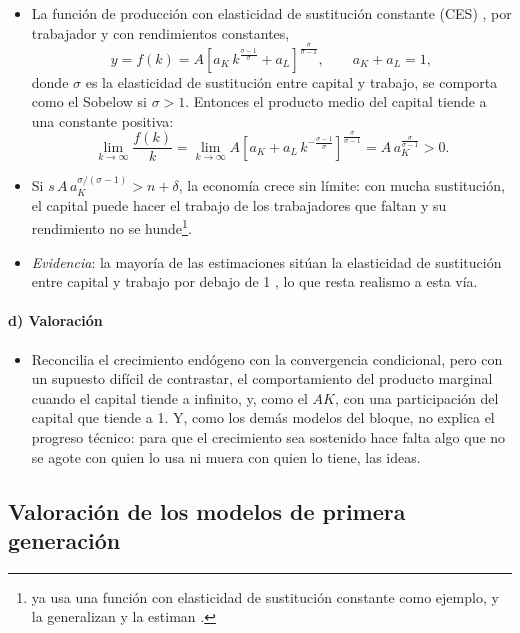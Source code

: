 \documentclass[11pt]{article}
\begin{document}
\begin{itemize}
\item La función de producción con elasticidad de sustitución constante (CES) , por trabajador y con rendimientos constantes,
  \[y=f(k)=A\left[a_K\,k^{\frac{\sigma-1}{\sigma}}+a_L\right]^{\frac{\sigma}{\sigma-1}},\qquad a_K+a_L=1,\]
  donde $\sigma$ es la elasticidad de sustitución entre capital y trabajo, se comporta como el Sobelow si $\sigma>1$. Entonces el producto medio del capital tiende a una constante positiva:
  \[\lim_{k\to\infty}\frac{f(k)}{k}=\lim_{k\to\infty}A\left[a_K+a_L\,k^{-\frac{\sigma-1}{\sigma}}\right]^{\frac{\sigma}{\sigma-1}}=A\,a_K^{\frac{\sigma}{\sigma-1}}>0.\]
\item Si $s\,A\,a_K^{\sigma/(\sigma-1)}>n+\delta$, la economía crece sin límite: con mucha sustitución, el capital puede hacer el trabajo de los trabajadores que faltan y su rendimiento no se hunde\nocite{BarroSalaiMartin2004}\footnote{\textcite[p.~77]{Solow1956} ya usa una función con elasticidad de sustitución constante como ejemplo, y \textcite{ArrowCheneryMinhasSolow1961} la generalizan y la estiman\nocite{KlumpPreissler2000} .}.
\item \emph{Evidencia}: la mayoría de las estimaciones sitúan la elasticidad de sustitución entre capital y trabajo por debajo de 1 , lo que resta realismo a esta vía.
\end{itemize}

\paragraph{d) Valoración}

\begin{itemize}
\item Reconcilia el crecimiento endógeno con la convergencia condicional, pero con un supuesto difícil de contrastar, el comportamiento del producto marginal cuando el capital tiende a infinito, y, como el $AK$, con una participación del capital que tiende a 1. Y, como los demás modelos del bloque, no explica el progreso técnico: para que el crecimiento sea sostenido hace falta algo que no se agote con quien lo usa ni muera con quien lo tiene, las ideas.
\end{itemize}

\subsection{Valoración de los modelos de primera generación}\label{sec:pg-valoracion}
\end{document}
